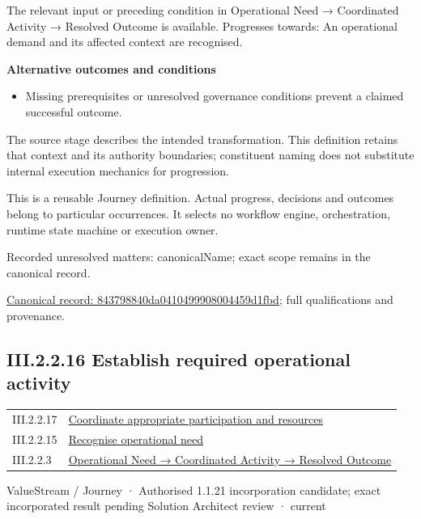 The relevant input or preceding condition in Operational Need → Coordinated Activity → Resolved Outcome is available. Progresses towards: An operational demand and its affected context are recognised.



\par\medskip\textbf{Alternative outcomes and conditions}\par


\begin{itemize}


\item Missing prerequisites or unresolved governance conditions prevent a claimed successful outcome.

\end{itemize}


The source stage describes the intended transformation. This definition retains that context and its authority boundaries; constituent naming does not substitute internal execution mechanics for progression.



This is a reusable Journey definition. Actual progress, decisions and outcomes belong to particular occurrences. It selects no workflow engine, orchestration, runtime state machine or execution owner.


{\small Recorded unresolved matters: canonicalName; exact scope remains in the canonical record.}\par
{\footnotesize \href{../../../../../../../continuum/strategy/value-stream/843798840da0410499908004459d1fbd.md}{Canonical record: 843798840da0410499908004459d1fbd}; full qualifications and provenance.}\par
\subsection*{III.2.2.16 Establish required operational activity}
\label{navigation:III.2.2.16}

\begin{longtable}{p{.22\linewidth}p{.73\linewidth}}
III.2.2.17 & \hyperref[element:429446296e4b4a64a11b1b3d8385b12e]{Coordinate appropriate participation and resources} \\
III.2.2.15 & \hyperref[element:843798840da0410499908004459d1fbd]{Recognise operational need} \\
III.2.2.3 & \hyperref[element:beea615ca7b34bbcbd0ad3a2a6ab2cff]{Operational Need → Coordinated Activity → Resolved Outcome} \\
\end{longtable}
\label{element:a3d8f16b4c69430e9024f002bdfb6c86}
{\small ValueStream / Journey · Authorised 1.1.21 incorporation candidate; exact incorporated result pending Solution Architect review · current}\par

